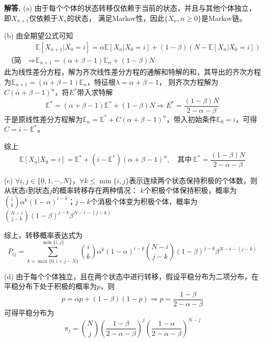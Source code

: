 \documentclass[12pt, a4paper, oneside]{ctexart}
\newenvironment{solution}[1][]{\par\noindent\textbf{#1解答. }}{\smallskip\par}  %
\def\E{\mathbb{E}}          %
\def\add{\vspace{1ex}}      %
\begin{document}
\begin{solution}
    (a) 由于每个个体的状态转移仅依赖于当前的状态，并且与其他个体独立，即$X_{n+1}$仅依赖于$X_n$的状态，
    满足Markov性，因此$\{X_n,n\geqslant 0\}$是Markov链。

    (b) 由全期望公式可知
    \begin{align*}
        &\ \E[X_{n+1}|X_0=i] = \alpha\E[X_{n}|X_0=i] + (1-\beta)(N-\E[X_n|X_0=i])\\
        \text{（简记）}\Rightarrow&\ \E_{n+1} = (\alpha+\beta-1)\E_{n} + (1-\beta)N
    \end{align*}
    此为线性差分方程，解为齐次线性差分方程的通解和特解的和，其导出的齐次方程为$\E_{n+1}=(\alpha+\beta-1)\E_{n}$，特征根$\lambda = \alpha+\beta-1$，
    则齐次方程解为$C(\alpha+\beta-1)^n$，将$E^*$带入求特解
    \begin{equation*}
        \E^* = (\alpha+\beta-1)\E^* + (1-\beta)N\Rightarrow E^* = \frac{(1-\beta)N}{2-\alpha-\beta}
    \end{equation*}
    于是原线性差分方程解为$\E_n = \E^*+C(\alpha+\beta-1)^n$，带入初始条件$\E_0 = i$，可得$C = i - \E^*$。
    
    综上
    \begin{equation*}
        \E[X_n|X_0=i] = \E^*+(i-\E^*)(\alpha+\beta-1)^n,\quad\text{其中}\ \E^* = \frac{(1-\beta)N}{2-\alpha-\beta}
    \end{equation*}

    (c) $\forall i, j\in\{0,1,\cdots,N\}$，\add $\forall k\leqslant\min\{i,j\}$表示连续两个状态保持积极的个体数，则从状态$i$到状态$j$的概率转移存在两种情况：
    $k$个积极个体保持积极，概率为$\binom{i}{k}\alpha^k(1-\alpha)^{i-k}$；$j-k$个消极个体变为积极个体，概率为
    $\binom{N-i}{j-k}(1-\beta)^{j-k}\beta^{N-i-(j-k)}$
    
    综上，转移概率表达式为
    \begin{equation*}
        P_{ij} = \sum_{k=\max\{0,i+j-N\}}^{\min\{i,j\}}\binom{i}{k}\alpha^k(1-\alpha)^{i-k}\binom{N-i}{j-k}(1-\beta)^{j-k}\beta^{N-i-(j-k)}
    \end{equation*}

    (d) 由于每个个体独立，且在两个状态中进行转移，假设平稳分布为二项分布，在平稳分布下处于积极的概率为$p$，则
    \begin{equation*}
        p = \alpha p+(1-\beta)(1-p)\Rightarrow p = \frac{1-\beta}{2-\alpha-\beta}
    \end{equation*}
    可得平稳分布为
    \begin{equation*}
        \pi_j = \binom{N}{j}\left(\frac{1-\beta}{2-\alpha-\beta}\right)^j\left(\frac{1-\alpha}{2-\alpha-\beta}\right)^{N-j}
    \end{equation*}
\end{solution}
\end{document}
